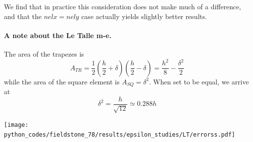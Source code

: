We find that in practice this consideration does not make much of a difference,
and that the $nelx=nely$ case actually yields slightly better results.

\paragraph{A note about the Le Talle m-e.}

\begin{center}
\end{center}

The area of the trapezes is 
\[
A_{TR}=\frac12 (\frac{h}{2}+\delta) (\frac{h}{2}-\delta) = \frac{h^2}{8}- \frac{\delta^2}{2}
\]
while the area of the square element is $A_{SQ}=\delta^2$.
When set to be equal, we arrive at
\[
\delta^2 = \frac{h}{\sqrt{12}} \simeq 0.288 h
\]


\begin{center}
\texttt{[image: python\_codes/fieldstone\_78/results/epsilon\_studies/LT/errorss.pdf]}
\end{center}





